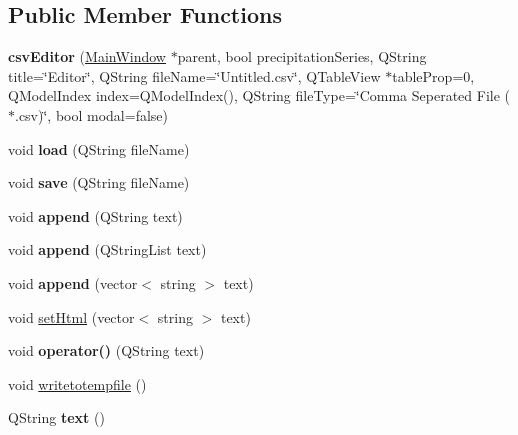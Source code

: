 \subsection*{Public Member Functions}
\begin{DoxyCompactItemize}
\item 
\mbox{\label{classcsv_editor_af03e314f282b5c75a2e00aa7e27ab227}} 
{\bfseries csv\+Editor} (\hyperlink{class_main_window}{Main\+Window} $\ast$parent, bool precipitation\+Series, Q\+String title=\char`\"{}Editor\char`\"{}, Q\+String file\+Name=\char`\"{}Untitled.\+csv\char`\"{}, Q\+Table\+View $\ast$table\+Prop=0, Q\+Model\+Index index=Q\+Model\+Index(), Q\+String file\+Type=\char`\"{}Comma Seperated File ($\ast$.csv)\char`\"{}, bool modal=false)
\item 
\mbox{\label{classcsv_editor_a3ebb5335bca4687681640c7932292e3a}} 
void {\bfseries load} (Q\+String file\+Name)
\item 
\mbox{\label{classcsv_editor_a8a76653c7a7c2787318ab4fbbfc3d5bc}} 
void {\bfseries save} (Q\+String file\+Name)
\item 
\mbox{\label{classcsv_editor_ab9b78fac92457e756c98551811ef4a49}} 
void {\bfseries append} (Q\+String text)
\item 
\mbox{\label{classcsv_editor_a9ce17c06bf66c2ef4dde75559e287e8c}} 
void {\bfseries append} (Q\+String\+List text)
\item 
\mbox{\label{classcsv_editor_aef2914c8b262da8f9797fc10f0cdcfa4}} 
void {\bfseries append} (vector$<$ string $>$ text)
\item 
void \hyperlink{classcsv_editor_a4bba903f33dc4129a3c896978679ae74}{set\+Html} (vector$<$ string $>$ text)
\item 
\mbox{\label{classcsv_editor_a08cfcdb5fd1862d2b201181eeb8745dd}} 
void {\bfseries operator()} (Q\+String text)
\item 
void \hyperlink{classcsv_editor_aaddc114a926c5d1f9ebcfdec25d3471c}{writetotempfile} ()
\item 
\mbox{\label{classcsv_editor_a492e402d9cfa6ba07bc0bb6a5be5c4b7}} 
Q\+String {\bfseries text} ()
\end{DoxyCompactItemize}


